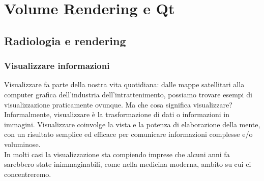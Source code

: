 
\chapter{Volume Rendering e Qt}
\label{cap:teoria-stage}

\section{Radiologia e rendering}
\subsection{Visualizzare informazioni}\label{sec:visualizzare-informazioni}
Visualizzare fa parte della nostra vita quotidiana: dalle mappe satellitari alla computer grafica dell'industria dell'intrattenimento, possiamo trovare esempi di visualizzazione praticamente ovunque. Ma che cosa significa visualizzare? Informalmente, visualizzare è la trasformazione di dati o informazioni in immagini. Visualizzare coinvolge la vista e la potenza di elaborazione della mente, con un risultato semplice ed efficace per comunicare informazioni complesse e/o voluminose.
\\
In molti casi la visualizzazione sta compiendo imprese che alcuni anni fa sarebbero state inimmaginabili, come nella medicina moderna, ambito su cui ci concentreremo.

